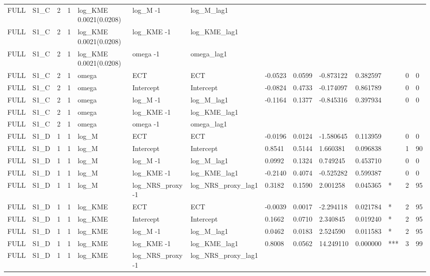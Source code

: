 \begin{tabular}{llllllllllllll}
FULL & S1\_C & 2 & 1 & log\_KME 0.0021(0.0208) & log\_M -1 & log\_M\_lag1 &  &  &  &  &  &  &  \\
FULL & S1\_C & 2 & 1 & log\_KME 0.0021(0.0208) & log\_KME -1 & log\_KME\_lag1 &  &  &  &  &  &  &  \\
FULL & S1\_C & 2 & 1 & log\_KME 0.0021(0.0208) & omega -1 & omega\_lag1 &  &  &  &  &  &  &  \\
FULL & S1\_C & 2 & 1 & omega & ECT & ECT & -0.0523 & 0.0599 & -0.873122 & 0.382597 &  & 0 & 0 \\
FULL & S1\_C & 2 & 1 & omega & Intercept & Intercept & -0.0824 & 0.4733 & -0.174097 & 0.861789 &  & 0 & 0 \\
FULL & S1\_C & 2 & 1 & omega & log\_M -1 & log\_M\_lag1 & -0.1164 & 0.1377 & -0.845316 & 0.397934 &  & 0 & 0 \\
FULL & S1\_C & 2 & 1 & omega & log\_KME -1 & log\_KME\_lag1 &  &  &  &  &  &  &  \\
FULL & S1\_C & 2 & 1 & omega & omega -1 & omega\_lag1 &  &  &  &  &  &  &  \\
FULL & S1\_D & 1 & 1 & log\_M & ECT & ECT & -0.0196 & 0.0124 & -1.580645 & 0.113959 &  & 0 & 0 \\
FULL & S1\_D & 1 & 1 & log\_M & Intercept & Intercept & 0.8541 & 0.5144 & 1.660381 & 0.096838 &  & 1 & 90 \\
FULL & S1\_D & 1 & 1 & log\_M & log\_M -1 & log\_M\_lag1 & 0.0992 & 0.1324 & 0.749245 & 0.453710 &  & 0 & 0 \\
FULL & S1\_D & 1 & 1 & log\_M & log\_KME -1 & log\_KME\_lag1 & -0.2140 & 0.4074 & -0.525282 & 0.599387 &  & 0 & 0 \\
FULL & S1\_D & 1 & 1 & log\_M & log\_NRS\_proxy -1 & log\_NRS\_proxy\_lag1 & 0.3182 & 0.1590 & 2.001258 & 0.045365 & * & 2 & 95 \\
FULL & S1\_D & 1 & 1 & log\_KME & ECT & ECT & -0.0039 & 0.0017 & -2.294118 & 0.021784 & * & 2 & 95 \\
FULL & S1\_D & 1 & 1 & log\_KME & Intercept & Intercept & 0.1662 & 0.0710 & 2.340845 & 0.019240 & * & 2 & 95 \\
FULL & S1\_D & 1 & 1 & log\_KME & log\_M -1 & log\_M\_lag1 & 0.0462 & 0.0183 & 2.524590 & 0.011583 & * & 2 & 95 \\
FULL & S1\_D & 1 & 1 & log\_KME & log\_KME -1 & log\_KME\_lag1 & 0.8008 & 0.0562 & 14.249110 & 0.000000 & *** & 3 & 99 \\
FULL & S1\_D & 1 & 1 & log\_KME & log\_NRS\_proxy -1 & log\_NRS\_proxy\_lag1 &  &  &  &  &  &  &  \\

\end{tabular}
